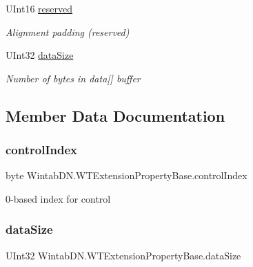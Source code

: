 \begin{DoxyCompactItemize}
U\+Int16 \mbox{\hyperlink{struct_wintab_d_n_1_1_w_t_extension_property_base_a8fd0e628c384df62d23e63c28874165e}{reserved}}
\begin{DoxyCompactList}\small\item\em Alignment padding (reserved) \end{DoxyCompactList}\item 
U\+Int32 \mbox{\hyperlink{struct_wintab_d_n_1_1_w_t_extension_property_base_a99b533c8c90f0da2dd596983c01e32fc}{data\+Size}}
\begin{DoxyCompactList}\small\item\em Number of bytes in data\mbox{[}\mbox{]} buffer \end{DoxyCompactList}\end{DoxyCompactItemize}


\subsection{Member Data Documentation}
\mbox{\label{struct_wintab_d_n_1_1_w_t_extension_property_base_a8da2af5b03fdae926e703ec56a9fe99b}} 
\subsubsection{\texorpdfstring{control\+Index}{controlIndex}}
{\footnotesize\ttfamily byte Wintab\+D\+N.\+W\+T\+Extension\+Property\+Base.\+control\+Index}



0-\/based index for control 

\mbox{\label{struct_wintab_d_n_1_1_w_t_extension_property_base_a99b533c8c90f0da2dd596983c01e32fc}} 
\subsubsection{\texorpdfstring{data\+Size}{dataSize}}
{\footnotesize\ttfamily U\+Int32 Wintab\+D\+N.\+W\+T\+Extension\+Property\+Base.\+data\+Size}



